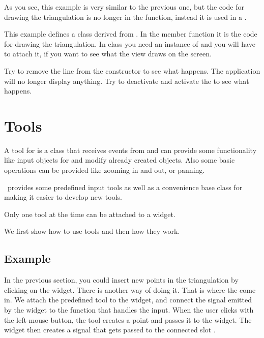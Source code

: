 As you see, this example is very similar to the previous one, but
the code for drawing the triangulation is no longer in the 
 function, instead it is used in a .

This example defines a class derived from . In the member
function  it is the code for drawing the triangulation. In 
 class you need an instance of  and you will have to attach it, if you want to see what the view draws on the screen.

Try to remove the line  from the constructor to see
what happens. The application will no longer display anything. Try to
deactivate and activate the  to see what happens.


\section{Tools}
\label{Qt_widget_tools}

A tool for  is a class that receives events from
 and can provide some functionality like input
objects for  and modify already created
objects. Also some basic operations can be provided like zooming in
and out, or panning.

\cgal\ provides some predefined input tools as well as a convenience base class 
 for making it easier to develop new tools.

Only one tool at the time can be attached to a widget.

We first show how to use tools and then how they work.

\subsection{Example}

In the previous section, you could insert new points in the triangulation by clicking on the widget. There is another way of doing it. That is where the  come in. We attach the predefined tool  to the widget, and connect the signal emitted by the widget to the function that 
handles the input.  When the user clicks with the left mouse button, the tool creates
a point and passes it to the widget. The widget then creates a signal that gets passed
to the connected slot .

